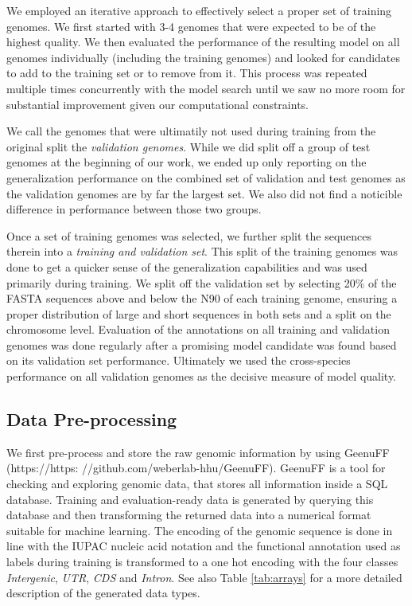 \documentclass{bioinfo}
\begin{document}
\begin{methods}
We employed an iterative approach to effectively select a proper set of training 
genomes. We first started with 3-4 genomes that were expected to be of the 
highest quality. We then evaluated the performance of the resulting model on all 
genomes individually (including the training genomes) and looked for candidates to 
add to the training set or to remove from it. This process was repeated multiple 
times concurrently with the model search until we saw no more room for substantial 
improvement given our computational constraints.

We call the genomes that were ultimatily not used during training from the original 
split the {\it validation genomes}. While we did split off a group of test genomes 
at the beginning of our work, we ended up only reporting on the generalization 
performance on the combined set of validation and test genomes as the validation 
genomes are by far the largest set. We also did not find a noticible difference in 
performance between those two groups. 

Once a set of training genomes was selected, we further split the sequences therein into a {\it 
training and validation set}. This split of the training genomes was done to get a 
quicker sense of the generalization capabilities and was used primarily during 
training. We split off the validation set by selecting 20\% of the FASTA sequences 
above and below the N90 of each training genome, ensuring a proper distribution of 
large and short sequences in both sets and a split on the chromosome level. 
Evaluation of the annotations on all training and validation genomes was done 
regularly after a promising model candidate was found based on its validation set 
performance. Ultimately we used the cross-species performance on all 
validation genomes as the decisive measure of model quality.

\subsection{Data Pre-processing}
We first pre-process and store the raw genomic information by using GeenuFF (https://https:
//github.com/weberlab-hhu/GeenuFF). GeenuFF is a tool for checking and exploring genomic data, that 
stores all information inside a SQL database. Training and evaluation-ready data is 
generated by querying this database and then transforming the returned data into a 
numerical format suitable for machine learning. The encoding of the genomic sequence 
is done in line with the IUPAC nucleic acid notation and the functional annotation 
used as labels during training is transformed to a one hot encoding with the four 
classes {\it Intergenic}, {\it UTR}, {\it CDS} and {\it Intron}. See also Table 
\ref{tab:arrays} for a more detailed description of the generated data types.


\end{methods}
\end{document}
